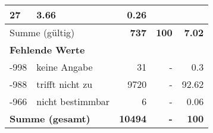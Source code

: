 \begin{longtable}{lXrrr}
       \num{27} &
       \num[round-mode=places,round-precision=2]{3.66} &
         \num[round-mode=places,round-precision=2]{0.26} \\
     \midrule
     \multicolumn{2}{l}{Summe (gültig)} &
       \textbf{\num{737}} &
     \textbf{\num{100}} &
       \textbf{\num[round-mode=places,round-precision=2]{7.02}} \\
     \multicolumn{5}{l}{\textbf{Fehlende Werte}}\\
       -998 &
       keine Angabe &
         \num{31} &
        - &
         \num[round-mode=places,round-precision=2]{0.3} \\
       -988 &
       trifft nicht zu &
         \num{9720} &
        - &
         \num[round-mode=places,round-precision=2]{92.62} \\
       -966 &
       nicht bestimmbar &
         \num{6} &
        - &
         \num[round-mode=places,round-precision=2]{0.06} \\
     \midrule
     \multicolumn{2}{l}{\textbf{Summe (gesamt)}} &
          \textbf{\num{10494}} &
        \textbf{-} &
        \textbf{\num{100}} \\
     \bottomrule
     \end{longtable}
     
